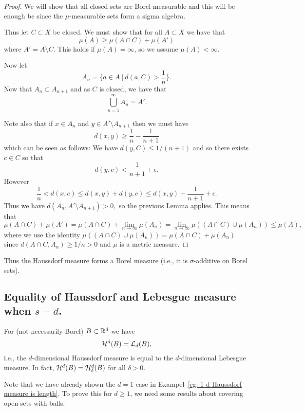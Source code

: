 \documentclass[twoside, a4paper, 10pt]{amsart}
\begin{document}
\begin{proof} We will show that all closed sets are Borel measurable and this will be enough be since the $\mu$-measurable sets form a sigma algebra.

Thus let $C \subset X$ be closed. We must show that for all $A \subset X$ we have that $$\mu(A) \geq \mu(A \cap C) + \mu(A')$$ where $A' = A \setminus C$. This holds if $\mu(A) = \infty$, so we assume $\mu(A) < \infty$. 

Now let $$A_n = \{a \in A ~|~ d(a, C) > \frac{1}{n} \}.$$ Now that $A_n \subset A_{n+1}$ and as $C$ is closed, we have that $$\bigcup_{n=1}^{\infty} A_n = A'.$$ 

Note also that if $x \in A_n$ and $y \in A' \setminus A_{n+1}$ then we must have $$d(x,y) \geq \frac{1}{n} - \frac{1}{n+1}$$ which can be seen as follows: We have $d(y, C) \leq 1/(n+1)$ and so there exists $c \in C$ so that $$d(y,c) < \frac{1}{n+1} + \epsilon.$$ However $$\frac{1}{n} < d(x,c) \leq d(x,y) + d(y,c) \leq d(x,y) + \frac{1}{n+1} + \epsilon.$$ Thus we have $d(A_n, A' \setminus A_{n+1}) >0,$ so the previous Lemma applies. This means that $$\mu(A \cap C) + \mu(A') =\mu(A \cap C) + \lim_{n \to \infty} \mu(A_n) = \lim_{n \to \infty} \mu((A \cap C) \cup \mu(A_n)) \leq \mu(A),$$ where we use the identity $\mu((A \cap C) \cup \mu(A_n)) = \mu(A \cap C) + \mu(A_n)$ since $d(A \cap C, A_n) \geq 1/n > 0$ and $\mu$ is a metric measure. \end{proof}

Thus the Haussdorf measure forms a Borel measure (i.e., it is $\sigma$-additive on Borel sets).

\subsection{Equality of Haussdorf and Lebesgue measure when $s=d$.}

\begin{prop}\label{prop: Haussdorf is Lebesgue} For (not necessarily Borel) $B \subset \mathbb{R}^d$ we have $$\mathcal{H}^d(B) = \mathcal{L}_d(B),$$ i.e., the $d$-dimensional Haussdorf measure is equal to the $d$-dimensional Lebesgue measure. In fact, $\mathcal{H}^d(B) = \mathcal{H}^d_{\delta}(B)$ for all $\delta>0$.

\end{prop}

Note that we have already shown the $d=1$ case in Exampel~\ref{eg: 1-d Haussdorf measure is length}. To prove this for $d \geq 1$, we need some results about covering open sets with balls.
\end{document}
